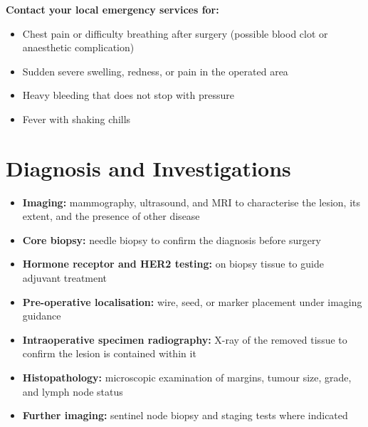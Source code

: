 \textbf{Contact your local emergency services for:}
\begin{itemize}
    \item Chest pain or difficulty breathing after surgery (possible blood clot or anaesthetic complication)
    \item Sudden severe swelling, redness, or pain in the operated area
    \item Heavy bleeding that does not stop with pressure
    \item Fever with shaking chills
\end{itemize}

\section*{Diagnosis and Investigations}
\begin{itemize}
    \item \textbf{Imaging:} mammography, ultrasound, and MRI to characterise the lesion, its extent, and the presence of other disease
    \item \textbf{Core biopsy:} needle biopsy to confirm the diagnosis before surgery
    \item \textbf{Hormone receptor and HER2 testing:} on biopsy tissue to guide adjuvant treatment
    \item \textbf{Pre-operative localisation:} wire, seed, or marker placement under imaging guidance
    \item \textbf{Intraoperative specimen radiography:} X-ray of the removed tissue to confirm the lesion is contained within it
    \item \textbf{Histopathology:} microscopic examination of margins, tumour size, grade, and lymph node status
    \item \textbf{Further imaging:} sentinel node biopsy and staging tests where indicated
\end{itemize}

